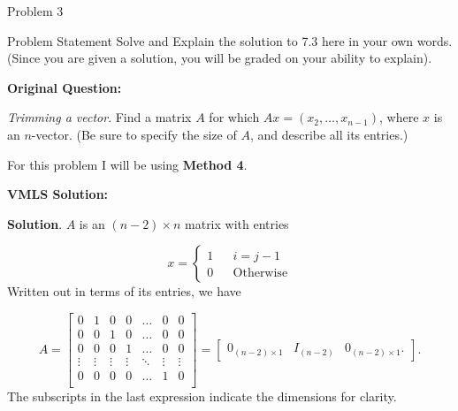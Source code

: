 \begin{problem}{Problem 3}
    \begin{statement}{Problem Statement}
        Solve and Explain the solution to 7.3  here in your own words. (Since you are given a solution, you will be graded on your ability to explain). \vspace*{1em}

        \noindent \textbf{Original Question:} \vspace*{1em}

        \textit{Trimming a vector}. Find a matrix $A$ for which $Ax = (x_{2}, \dots , x_{n - 1})$, where $x$ is an $n$-vector. (Be sure to specify the size of $A$, and describe all its entries.)
    \end{statement}

    \begin{Highlight}[Solution]
        For this problem I will be using \textbf{Method 4}. \vspace*{1em}

        \noindent \textbf{VMLS Solution:} \vspace*{1em}

        \textbf{Solution}. $A$ is an $(n - 2) \times n$ matrix with entries

        \begin{equation*}
            x = \left\{
                \begin{aligned}
                    1 & & i = j - 1 \\
                    0 & & \text{Otherwise} 
                \end{aligned}
            \right.
        \end{equation*}
        Written out in terms of its entries, we have

        \begin{equation*}
            A = 
            \begin{bmatrix}
                0 & 1 & 0 & 0 & \dots & 0 & 0 \\
                0 & 0 & 1 & 0 & \dots & 0 & 0 \\
                0 & 0 & 0 & 1 & \dots & 0 & 0 \\
                \vdots & \vdots & \vdots & \vdots & \ddots & \vdots & \vdots \\
                0 & 0 & 0 & 0 & \dots & 1 & 0 \\
            \end{bmatrix}
            = 
            \begin{bmatrix}
                0_{(n-2)\times 1} & I_{(n-2)} & 0_{(n - 2) \times 1}.
            \end{bmatrix}.
        \end{equation*}
        The subscripts in the last expression indicate the dimensions for clarity.


\end{Highlight}
\end{problem}
